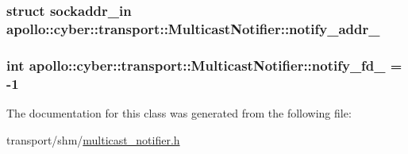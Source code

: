 \hypertarget{classapollo_1_1cyber_1_1transport_1_1MulticastNotifier_a1a48d464db71ad53df1591216d7e2cd9}{
\subsubsection[{notify\-\_\-addr\-\_\-}]{\setlength{\rightskip}{0pt plus 5cm}struct sockaddr\-\_\-in apollo\-::cyber\-::transport\-::\-Multicast\-Notifier\-::notify\-\_\-addr\-\_\-\hspace{0.3cm}{\ttfamily [private]}}}\label{classapollo_1_1cyber_1_1transport_1_1MulticastNotifier_a1a48d464db71ad53df1591216d7e2cd9}
\hypertarget{classapollo_1_1cyber_1_1transport_1_1MulticastNotifier_aef815f74c3b4dd01aef9693f18cf7d6a}{
\subsubsection[{notify\-\_\-fd\-\_\-}]{\setlength{\rightskip}{0pt plus 5cm}int apollo\-::cyber\-::transport\-::\-Multicast\-Notifier\-::notify\-\_\-fd\-\_\- = -\/1\hspace{0.3cm}{\ttfamily [private]}}}\label{classapollo_1_1cyber_1_1transport_1_1MulticastNotifier_aef815f74c3b4dd01aef9693f18cf7d6a}


The documentation for this class was generated from the following file\-:\begin{DoxyCompactItemize}
\item 
transport/shm/\hyperlink{multicast__notifier_8h}{multicast\-\_\-notifier.\-h}\end{DoxyCompactItemize}

